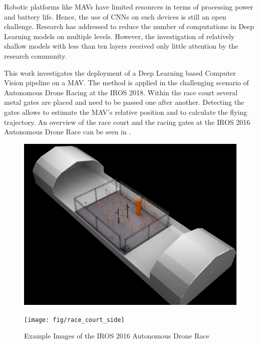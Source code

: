 Robotic platforms like \acp{MAV} have limited resources in terms of processing power and battery life. Hence, the use of \acp{CNN} on such devices is still an open challenge. Research has addressed to reduce the number of computations in Deep Learning models on multiple levels\cite{YoungwanLee, Zagoruyko2016, Howard2017, Ghosh2017, Sandler2018, Zhang2017a}. However, the investigation of relatively shallow models with less than ten layers received only little attention by the research community.

This work investigates the deployment of a Deep Learning based Computer Vision pipeline on a \ac{MAV}. The method is applied in the challenging scenario of Autonomous Drone Racing at the \ac{IROS} 2018. Within the race court several metal gates are placed and need to be passed one after another. Detecting the gates allows to estimate the \ac{MAV}'s relative position and to calculate the flying trajectory. An overview of the race court and the racing gates at the \ac{IROS} 2016 Autonomous Drone Race can be seen in .

\begin{figure}[bhtp]
	\centering
	\begin{minipage}{0.45\linewidth}
	\includegraphics[width=\textwidth]{fig/race_court}
	\end{minipage}\hfill
\begin{minipage}{0.45\linewidth}
	\texttt{[image: fig/race\_court\_side]}
\end{minipage}
\caption{Example Images of the \ac{IROS} 2016 Autonomous Drone Race}
\label{fig:race_court}
\end{figure}


